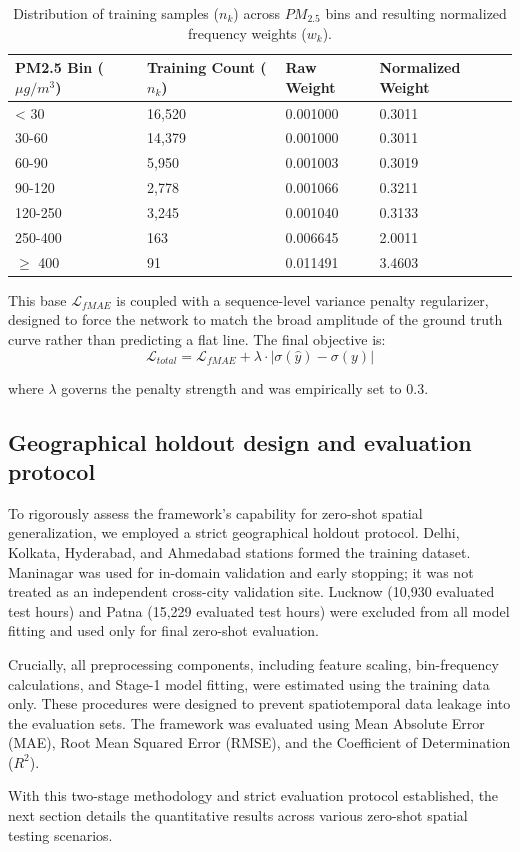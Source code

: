 \begin{table}[h]
\centering
\caption{Distribution of training samples ($n_k$) across $PM_{2.5}$ bins and resulting normalized frequency weights ($w_k$).}
\label{tab:bin_weights}
\begin{tabular}{llll}
\toprule
\textbf{PM2.5 Bin ($\mu g/m^3$)} & \textbf{Training Count ($n_k$)} & \textbf{Raw Weight} & \textbf{Normalized Weight} \\
\midrule
< 30 & 16,520 & 0.001000 & 0.3011 \\
30-60 & 14,379 & 0.001000 & 0.3011 \\
60-90 & 5,950 & 0.001003 & 0.3019 \\
90-120 & 2,778 & 0.001066 & 0.3211 \\
120-250 & 3,245 & 0.001040 & 0.3133 \\
250-400 & 163 & 0.006645 & 2.0011 \\
$\ge$ 400 & 91 & 0.011491 & 3.4603 \\
\bottomrule
\end{tabular}
\end{table}

This base $\mathcal{L}_{fMAE}$ is coupled with a sequence-level variance penalty regularizer, designed to force the network to match the broad amplitude of the ground truth curve rather than predicting a flat line. The final objective is:
\begin{equation}
    \mathcal{L}_{total} = \mathcal{L}_{fMAE} + \lambda \cdot \Big| \sigma(\hat{y}) - \sigma(y) \Big|
\end{equation}

where $\lambda$ governs the penalty strength and was empirically set to 0.3.

\subsection{Geographical holdout design and evaluation protocol}
To rigorously assess the framework's capability for zero-shot spatial generalization, we employed a strict geographical holdout protocol. Delhi, Kolkata, Hyderabad, and Ahmedabad stations formed the training dataset. Maninagar was used for in-domain validation and early stopping; it was not treated as an independent cross-city validation site. Lucknow (10,930 evaluated test hours) and Patna (15,229 evaluated test hours) were excluded from all model fitting and used only for final zero-shot evaluation.

Crucially, all preprocessing components, including feature scaling, bin-frequency calculations, and Stage-1 model fitting, were estimated using the training data only. These procedures were designed to prevent spatiotemporal data leakage into the evaluation sets. The framework was evaluated using Mean Absolute Error (MAE), Root Mean Squared Error (RMSE), and the Coefficient of Determination ($R^2$).

\vspace{0.5cm}
\noindent With this two-stage methodology and strict evaluation protocol established, the next section details the quantitative results across various zero-shot spatial testing scenarios.
